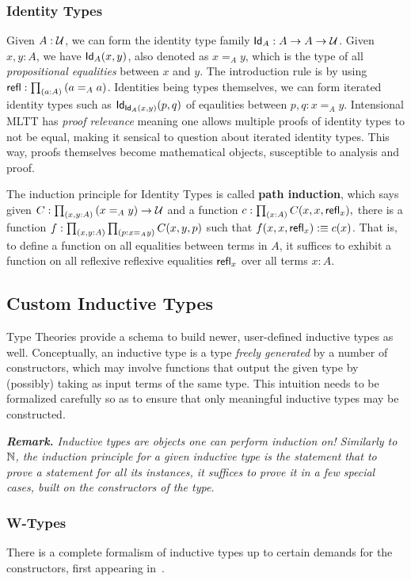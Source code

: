 \subsubsection{Identity Types}
Given $A : \mathcal{U}$, we can form the identity type family $\mathsf{Id}_A : A \to A \to \mathcal{U}$. Given $x, y: A$, we have $\mathsf{Id}_A(x,y)$, also denoted as
$x =_A y$, which is the type of all \textit{propositional equalities} between $x$ and $y$. The introduction rule is by using
$\mathsf{refl} : \prod_{(a:A)}{(}a =_A a)$.
Identities being types themselves, we can form iterated identity types such as $\mathsf{Id}_{\mathsf{Id}_A(x,y)}(p,q)$ of eqaulities between
$p, q : x =_A y$. Intensional MLTT has \emph{proof relevance} meaning one allows multiple proofs of identity types to not be equal,
making it sensical to question about iterated identity types.
This way, proofs themselves become mathematical objects, susceptible to analysis and proof.

The induction principle for Identity Types is called \textbf{path induction}, which says 
given $C : \prod_{(x, y : A)}{(}x =_A y) \to \mathcal{U}$ and a function $c : \prod_{(x : A)}{C(x,x,\mathsf{refl}_x)},$
there is a function $f : \prod_{(x,y : A)}{\prod_{(p: x =_A y)}{C}(x,y,p)}$ such that $f(x,x,\mathsf{refl}_x) :\equiv c(x)$.
That is, to define a function on all equalities between terms in $A$, it suffices to exhibit a function on all
reflexive reflexive equalities $\mathsf{refl}_x$ over all terms $x : A$.

\subsection{Custom Inductive Types}
Type Theories provide a schema to build newer, user-defined inductive types as well.
Conceptually, an inductive type is a type \textit{freely generated} by a number of constructors, which may involve functions
that output the given type by (possibly) taking as input terms of the same type. This intuition needs
to be formalized carefully so as to ensure that only meaningful inductive types may be constructed.

\textit{\textbf{Remark.} Inductive types are objects one can perform induction on! 
Similarly to $\mathbb{N}$, the \textit{induction principle} for a given inductive type is the statement that to prove a
statement for all its instances, it suffices to prove it in a few special cases, built on the constructors
of the type.}

\subsubsection{W-Types}
There is a complete formalism of inductive types up to certain demands for the constructors, first appearing in~\cite{martin1982constructive}.

